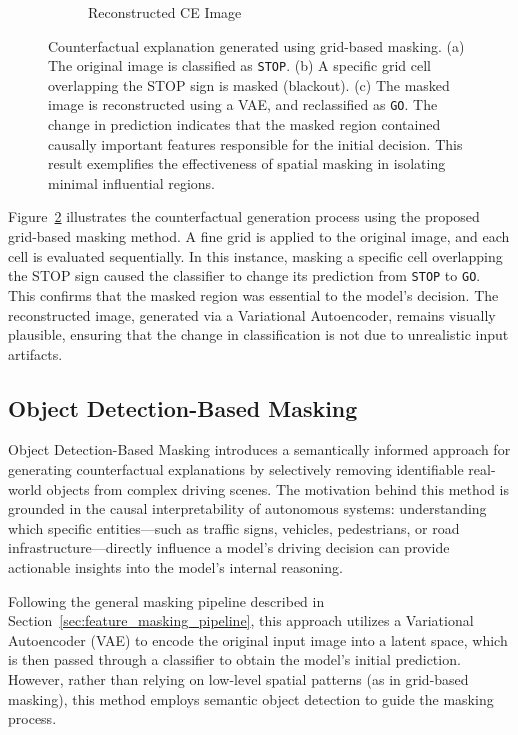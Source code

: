 \begin{figure}[htbp]
\begin{subfigure}[b]{0.3\textwidth}
    \caption{Reconstructed CE Image}
    \label{fig:grid_recon}
\end{subfigure}
\caption{
Counterfactual explanation generated using grid-based masking. (a) The original image is classified as \texttt{STOP}. (b) A specific grid cell overlapping the STOP sign is masked (blackout). (c) The masked image is reconstructed using a VAE, and reclassified as \texttt{GO}. The change in prediction indicates that the masked region contained causally important features responsible for the initial decision. This result exemplifies the effectiveness of spatial masking in isolating minimal influential regions.
}
\label{fig:grid_ce_example}
\end{figure}

Figure~\ref{fig:grid_ce_example} illustrates the counterfactual generation process using the proposed grid-based masking method. A fine grid is applied to the original image, and each cell is evaluated sequentially. In this instance, masking a specific cell overlapping the STOP sign caused the classifier to change its prediction from \texttt{STOP} to \texttt{GO}. This confirms that the masked region was essential to the model’s decision. The reconstructed image, generated via a Variational Autoencoder, remains visually plausible, ensuring that the change in classification is not due to unrealistic input artifacts.




\subsection{Object Detection-Based Masking} \label{sec:object_detection_masking}

Object Detection-Based Masking introduces a semantically informed approach for generating counterfactual explanations by selectively removing identifiable real-world objects from complex driving scenes. The motivation behind this method is grounded in the causal interpretability of autonomous systems: understanding which specific entities—such as traffic signs, vehicles, pedestrians, or road infrastructure—directly influence a model's driving decision can provide actionable insights into the model's internal reasoning.

Following the general masking pipeline described in Section~\ref{sec:feature_masking_pipeline}, this approach utilizes a Variational Autoencoder (VAE) to encode the original input image into a latent space, which is then passed through a classifier to obtain the model’s initial prediction. However, rather than relying on low-level spatial patterns (as in grid-based masking), this method employs semantic object detection to guide the masking process.

